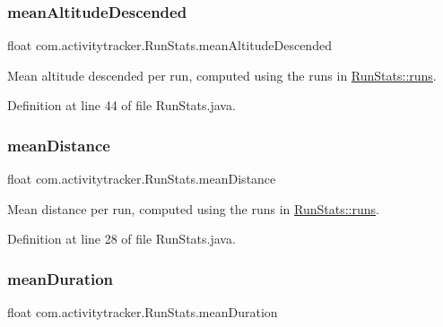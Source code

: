 \subsubsection{\texorpdfstring{mean\+Altitude\+Descended}{meanAltitudeDescended}}
{\footnotesize\ttfamily float com.\+activitytracker.\+Run\+Stats.\+mean\+Altitude\+Descended\hspace{0.3cm}{\ttfamily [package]}}

Mean altitude descended per run, computed using the runs in \mbox{\hyperlink{classcom_1_1activitytracker_1_1_run_stats_a0fd429e9f463ddf4897c507c0e3c0a12}{Run\+Stats\+::runs}}. 

Definition at line 44 of file Run\+Stats.\+java.

\mbox{\label{classcom_1_1activitytracker_1_1_run_stats_afcc9ab47852b6df6b15e9a592fe6c5ed}} 
\subsubsection{\texorpdfstring{mean\+Distance}{meanDistance}}
{\footnotesize\ttfamily float com.\+activitytracker.\+Run\+Stats.\+mean\+Distance\hspace{0.3cm}{\ttfamily [package]}}

Mean distance per run, computed using the runs in \mbox{\hyperlink{classcom_1_1activitytracker_1_1_run_stats_a0fd429e9f463ddf4897c507c0e3c0a12}{Run\+Stats\+::runs}}. 

Definition at line 28 of file Run\+Stats.\+java.

\mbox{\label{classcom_1_1activitytracker_1_1_run_stats_a8bf9f1577cffd26e6235695278bfcdb9}} 
\subsubsection{\texorpdfstring{mean\+Duration}{meanDuration}}
{\footnotesize\ttfamily float com.\+activitytracker.\+Run\+Stats.\+mean\+Duration\hspace{0.3cm}{\ttfamily [package]}}

